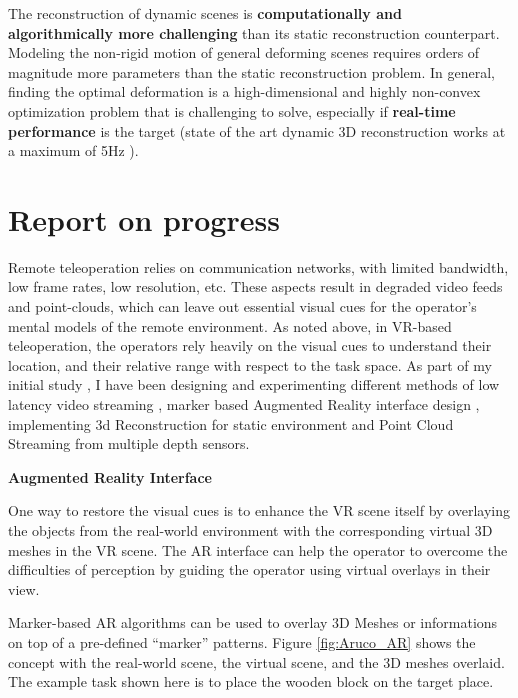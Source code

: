 The reconstruction of dynamic scenes is \textbf{computationally and algorithmically more challenging } than its static reconstruction counterpart. Modeling the non-rigid motion of general deforming scenes requires orders of magnitude more parameters than the static reconstruction problem. In general, finding the optimal deformation is a high-dimensional and highly non-convex optimization problem that is challenging to solve, especially if \textbf{real-time performance} is the target (state of the art dynamic 3D reconstruction works at a maximum of 5Hz \cite{inproceedings}).

\section{Report on progress}

Remote  teleoperation  relies  on  communication  networks,  with  limited  bandwidth,  low  frame  rates,  low  resolution,  etc.  These  aspects  result  in  degraded  video  feeds  and  point-clouds,  which  can  leave  out essential visual cues for the operator’s mental models of the remote environment. As noted above, in VR-based teleoperation, the operators rely heavily on the visual cues to understand their location, and their relative range with respect to the task space. 
As part of my initial study , I have been designing and experimenting different methods of low latency video streaming , marker based Augmented Reality interface design , implementing 3d Reconstruction for static environment and Point Cloud Streaming from multiple depth sensors.

\textbf{Augmented Reality Interface}

One way to restore the visual cues is to enhance the VR scene itself by overlaying the objects from the real-world environment with the corresponding virtual 3D meshes in the VR scene. The AR interface  can  help  the  operator to  overcome  the  difficulties  of  perception  by  guiding  the  operator using virtual overlays in their view.

Marker-based AR algorithms can be used to overlay 3D Meshes or informations on top of a  pre-defined “marker” patterns. Figure \ref{fig:Aruco_AR} shows the concept with the real-world scene, the virtual scene,  and  the  3D  meshes  overlaid.  The  example  task  shown  here  is to place the wooden block on the target place.

